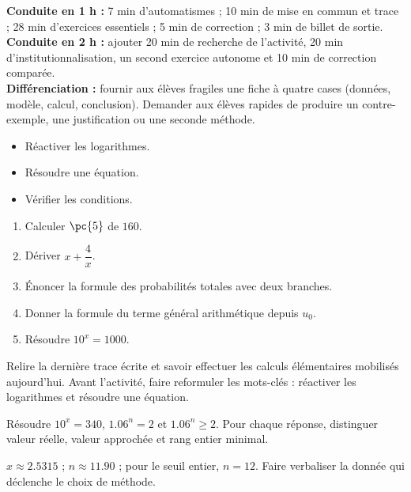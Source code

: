 \ifmxteacher
\begin{method}
\textbf{Conduite en 1 h :} 7 min d'automatismes ; 10 min de mise en commun et trace ; 28 min d'exercices essentiels ; 5 min de correction ; 3 min de billet de sortie.\\
\textbf{Conduite en 2 h :} ajouter 20 min de recherche de l'activité, 20 min d'institutionnalisation, un second exercice autonome et 10 min de correction comparée.\\
\textbf{Différenciation :} fournir aux élèves fragiles une fiche à quatre cases (données, modèle, calcul, conclusion). Demander aux élèves rapides de produire un contre-exemple, une justification ou une seconde méthode.
\end{method}
\fi
{}
\begin{objectives}\begin{itemize}\item Réactiver les logarithmes.\item Résoudre une équation.\item Vérifier les conditions.\end{itemize}\end{objectives}
\begin{fluency}\begin{enumerate}\item Calculer $\pc{5}$ de $160$. \item Dériver $x+\dfrac4x$. \item Énoncer la formule des probabilités totales avec deux branches. \item Donner la formule du terme général arithmétique depuis $u_0$. \item Résoudre $10^x=1000$. \end{enumerate}\end{fluency}
\begin{prerequisites}Relire la dernière trace écrite et savoir effectuer les calculs élémentaires mobilisés aujourd'hui. Avant l'activité, faire reformuler les mots-clés : réactiver les logarithmes et résoudre une équation.\end{prerequisites}

\begin{activity}
Résoudre $10^x=340$, $\num{1,06}^n=2$ et $\num{1,06}^n\geq2$. Pour chaque réponse, distinguer valeur réelle, valeur approchée et rang entier minimal.

\end{activity}
\begin{solution}$x\approx\num{2,5315}$ ; $n\approx\num{11,90}$ ; pour le seuil entier, $n=12$. Faire verbaliser la donnée qui déclenche le choix de méthode.\end{solution}

